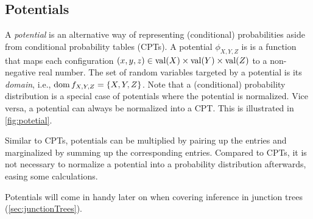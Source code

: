         \subsection{Potentials}
            A \emph{potential} is an alternative way of representing (conditional) probabilities aside from conditional probability tables (CPTs). A potential \(\phi_{X, Y, Z}\) is is a function that maps each configuration \( (x, y, z) \in \operatorname{val}(X) \times \operatorname{val}(Y) \times \operatorname{val}(Z) \) to a non-negative real number. The set of random variables targeted by a potential is its \emph{domain}, i.e., \( \operatorname{dom} f_{X, Y, Z} = \{ X, Y, Z \} \). Note that a (conditional) probability distribution is a special case of potentials where the potential is normalized. Vice versa, a potential can always be normalized into a CPT. This is illustrated in \autoref{fig:potetial}.

            Similar to CPTs, potentials can be multiplied by pairing up the entries and marginalized by summing up the corresponding entries. Compared to CPTs, it is not necessary to normalize a potential into a probability distribution afterwards, easing some calculations.

            Potentials will come in handy later on when covering inference in junction trees (\autoref{sec:junctionTrees}).

